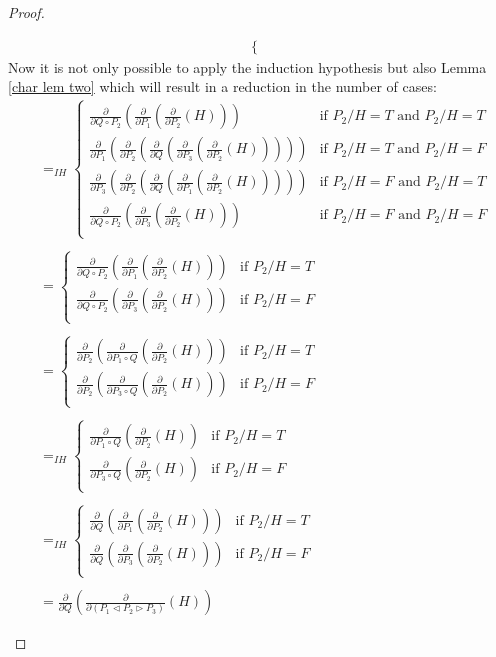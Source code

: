 \documentclass[a4paper,twoside,openright]{report}
\newcommand{\dd}[1]{\frac{\partial}{\partial #1}}
\newcommand{\lef}{\ensuremath{\triangleleft}}
\newcommand{\rig}{\ensuremath{\triangleright}}
\begin{document}
\begin{proof}
\begin{itemize}
\begin{align*}
\begin{cases}
\end{cases}
\end{align*}
Now it is not only possible to apply the induction hypothesis but also
Lemma \ref{char lem two} which will result in a reduction in the
number of cases:
\begin{align*}
&=_{IH}\begin{cases}
\dd{Q\circ P_2}(\dd{P_1}(\dd{P_2}(H))) & \text{if $P_2/H=T$ and $P_2/H=T$}\\
\dd{P_1}(\dd{P_2}(\dd Q(\dd{P_3}(\dd{P_2}(H))))) & \text{if $P_2/H=T$ and $P_2/H=F$}\\
\dd{P_3}(\dd{P_2}(\dd Q(\dd{P_1}(\dd{P_2}(H))))) & \text{if $P_2/H=F$ and $P_2/H=T$}\\
\dd{Q\circ P_2}(\dd{P_3}(\dd{P_2}(H))) & \text{if $P_2/H=F$ and $P_2/H=F$}\\
\end{cases}\\\\
&=\begin{cases}
\dd{Q\circ P_2}(\dd{P_1}(\dd{P_2}(H))) & \text{if $P_2/H=T$}\\
\dd{Q\circ P_2}(\dd{P_3}(\dd{P_2}(H))) & \text{if $P_2/H=F$}\\
\end{cases}\\\\
&=\begin{cases}
\dd{P_2}(\dd{P_1\circ Q}(\dd{P_2}(H))) & \text{if $P_2/H=T$}\\
\dd{P_2}(\dd{P_3\circ Q}(\dd{P_2}(H))) & \text{if $P_2/H=F$}\\
\end{cases}\\\\
&=_{IH}\begin{cases}
\dd{P_1\circ Q}(\dd{P_2}(H)) & \text{if $P_2/H=T$}\\
\dd{P_3\circ Q}(\dd{P_2}(H)) & \text{if $P_2/H=F$}\\
\end{cases}\\\\
&=_{IH}\begin{cases}
\dd Q(\dd{P_1}(\dd{P_2}(H))) & \text{if $P_2/H=T$}\\
\dd Q(\dd{P_3}(\dd{P_2}(H))) & \text{if $P_2/H=F$}\\
\end{cases}\\\\
&=\dd Q(\dd{(P_1\lef P_2\rig P_3)}(H))
\end{align*}
\end{itemize}
\end{proof}
\end{document}

